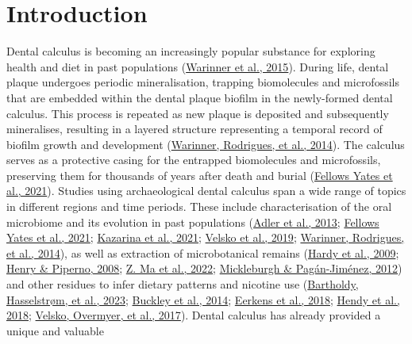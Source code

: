 \documentclass[
  letterpaper,
]{book}
\begin{document}
\newpage{}

\hypertarget{introduction}{%
\section{Introduction}\label{introduction}}

Dental calculus is becoming an increasingly popular substance for
exploring health and diet in past populations
(\protect\hyperlink{ref-warinnerNewEra2015}{Warinner et al., 2015}).
During life, dental plaque undergoes periodic mineralisation, trapping
biomolecules and microfossils that are embedded within the dental plaque
biofilm in the newly-formed dental calculus. This process is repeated as
new plaque is deposited and subsequently mineralises, resulting in a
layered structure representing a temporal record of biofilm growth and
development (\protect\hyperlink{ref-warinnerPathogensHost2014}{Warinner,
Rodrigues, et al., 2014}). The calculus serves as a protective casing
for the entrapped biomolecules and microfossils, preserving them for
thousands of years after death and burial
(\protect\hyperlink{ref-yatesOralMicrobiome2021}{Fellows Yates et al.,
2021}). Studies using archaeological dental calculus span a wide range
of topics in different regions and time periods. These include
characterisation of the oral microbiome and its evolution in past
populations (\protect\hyperlink{ref-adlerSequencingAncient2013}{Adler et
al., 2013}; \protect\hyperlink{ref-yatesOralMicrobiome2021}{Fellows
Yates et al., 2021};
\protect\hyperlink{ref-kazarinaPostmedievalMicrobial2021}{Kazarina et
al., 2021};
\protect\hyperlink{ref-velskoMicrobialDifferences2019}{Velsko et al.,
2019}; \protect\hyperlink{ref-warinnerPathogensHost2014}{Warinner,
Rodrigues, et al., 2014}), as well as extraction of microbotanical
remains (\protect\hyperlink{ref-hardyStarchGranules2009}{Hardy et al.,
2009}; \protect\hyperlink{ref-henryCalculusSyria2008}{Henry \& Piperno,
2008}; \protect\hyperlink{ref-maHumanDiet2022}{Z. Ma et al., 2022};
\protect\hyperlink{ref-mickleburghNewInsights2012}{Mickleburgh \&
Pagán-Jiménez, 2012}) and other residues to infer dietary patterns and
nicotine use
(\protect\hyperlink{ref-bartholdyMultiproxyAnalysis2023}{Bartholdy,
Hasselstrøm, et al., 2023};
\protect\hyperlink{ref-buckleyDentalCalculus2014}{Buckley et al., 2014};
\protect\hyperlink{ref-eerkensDentalCalculus2018}{Eerkens et al., 2018};
\protect\hyperlink{ref-hendyProteomicCalculus2018}{Hendy et al., 2018};
\protect\hyperlink{ref-velskoDentalCalculus2017}{Velsko, Overmyer, et
al., 2017}). Dental calculus has already provided a unique and valuable
\end{document}
